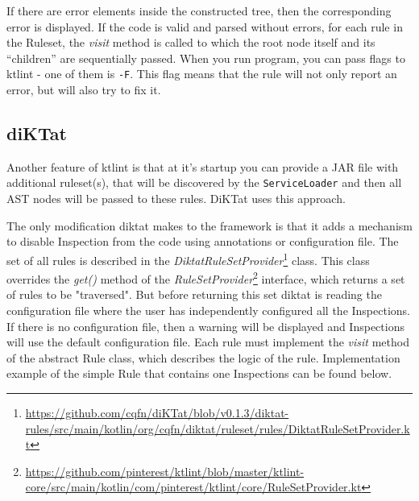 If there are error elements inside the constructed tree, then the corresponding error is displayed. If the code is valid and parsed without errors, for each rule in the Ruleset, the \textsl{visit} method is called to which the root node itself and its “children” are sequentially passed.
When you run program, you can pass flags to ktlint - one of them is \texttt{-F}. This flag means that the rule will not only report an error, but will also try to fix it.

\subsection{diKTat}

Another feature of ktlint is that at it's startup you can provide a JAR file with additional ruleset(s), that will be discovered by the \texttt{ServiceLoader} and then all AST nodes will be passed to these rules. DiKTat uses this approach.

The only modification diktat makes to the framework is that it adds a mechanism to disable Inspection from the code using annotations or configuration file. The set of all rules is described in the \textsl{DiktatRuleSetProvider}\footnote{\url{https://github.com/cqfn/diKTat/blob/v0.1.3/diktat-rules/src/main/kotlin/org/cqfn/diktat/ruleset/rules/DiktatRuleSetProvider.kt}} class. This class overrides the \textsl{get()} method of the \textsl{RuleSetProvider}\footnote{\url{https://github.com/pinterest/ktlint/blob/master/ktlint-core/src/main/kotlin/com/pinterest/ktlint/core/RuleSetProvider.kt}} interface, which returns a set of rules to be "traversed". But before returning this set diktat is reading the configuration file where the user has independently configured all the Inspections. If there is no configuration file, then a warning will be displayed and Inspections will use the default configuration file. 
Each rule must implement the \textsl{visit} method of the abstract Rule class, which describes the logic of the rule. Implementation example of the simple Rule that contains one Inspections can be found below.

